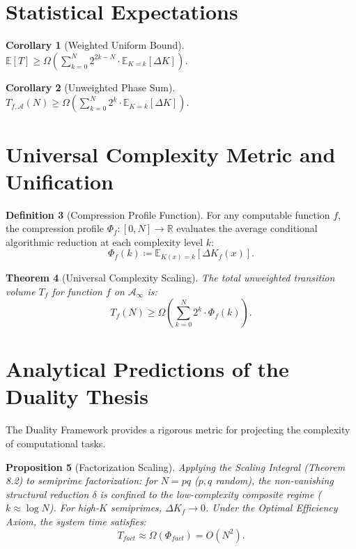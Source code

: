 \documentclass[12pt,a4paper]{article}
\theoremstyle{plain}
\newtheorem{theorem}{Theorem}[section]
\newtheorem{proposition}[theorem]{Proposition}
\newtheorem{corollary}[theorem]{Corollary}
\theoremstyle{definition}
\newtheorem{definition}[theorem]{Definition}
\begin{document}
\section{Statistical Expectations}

\begin{corollary}[Weighted Uniform Bound]
$\mathbb{E}[T] \ge \Omega\left(\sum_{k=0}^N 2^{2k-N} \cdot \mathbb{E}_{K=k}[\Delta K]\right)$.
\end{corollary}

\begin{corollary}[Unweighted Phase Sum]
$T_{f, \mathcal{A}}(N) \ge \Omega\left(\sum_{k=0}^N 2^k \cdot \mathbb{E}_{K=k}[\Delta K]\right)$.
\end{corollary}

\section{Universal Complexity Metric and Unification}

\begin{definition}[Compression Profile Function]
For any computable function $f$, the compression profile $\Phi_f : [0, N] \to \mathbb{R}$ evaluates the average conditional algorithmic reduction at each complexity level $k$:
\begin{equation}
\Phi_f(k) \coloneqq \mathbb{E}_{K(x)=k} \left[ \Delta K_{f}(x) \right].
\end{equation}
\end{definition}

\begin{theorem}[Universal Complexity Scaling]
The total unweighted transition volume $T_f$ for function $f$ on $\mathcal{A}_\infty$ is:
\begin{equation}
T_f(N) \ge \Omega\left(\sum_{k=0}^{N} 2^k \cdot \Phi_f(k)\right).
\end{equation}
\end{theorem}

\section{Analytical Predictions of the Duality Thesis}

The Duality Framework provides a rigorous metric for projecting the complexity of computational tasks.

\begin{proposition}[Factorization Scaling]
Applying the Scaling Integral (Theorem 8.2) to semiprime factorization: for $N = pq$ ($p, q$ random), the non-vanishing structural reduction $\delta$ is confined to the low-complexity composite regime ($k \approx \log N$). For high-$K$ semiprimes, $\Delta K_f \to 0$. Under the Optimal Efficiency Axiom, the system time satisfies:
\begin{equation}
T_{fact} \approx \Omega(\Phi_{fact}) = O(N^2).
\end{equation}
\end{proposition}
\end{document}
